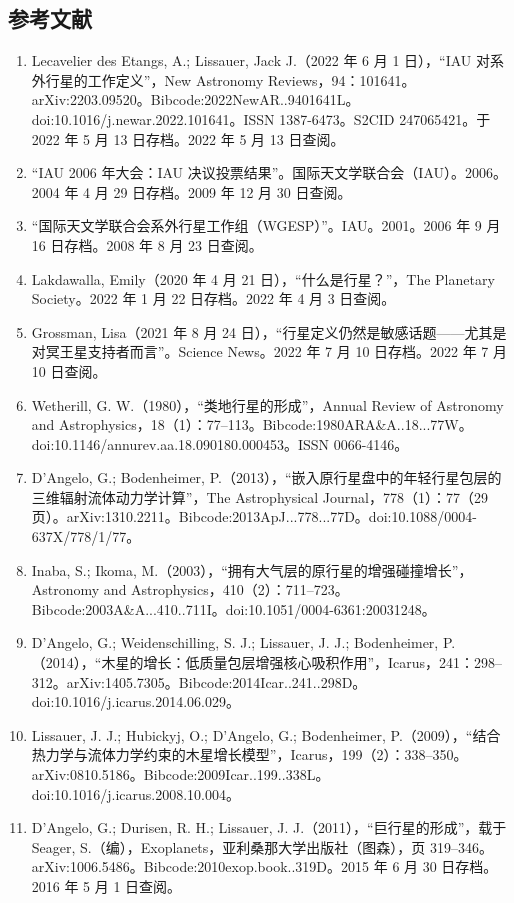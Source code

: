 \subsection{参考文献}
\begin{enumerate}
\item Lecavelier des Etangs, A.; Lissauer, Jack J.（2022 年 6 月 1 日），“IAU 对系外行星的工作定义”，New Astronomy Reviews，94：101641。arXiv:2203.09520。Bibcode:2022NewAR..9401641L。doi:10.1016/j.newar.2022.101641。ISSN 1387-6473。S2CID 247065421。于 2022 年 5 月 13 日存档。2022 年 5 月 13 日查阅。
\item “IAU 2006 年大会：IAU 决议投票结果”。国际天文学联合会（IAU）。2006。2004 年 4 月 29 日存档。2009 年 12 月 30 日查阅。
\item “国际天文学联合会系外行星工作组（WGESP）”。IAU。2001。2006 年 9 月 16 日存档。2008 年 8 月 23 日查阅。
\item Lakdawalla, Emily（2020 年 4 月 21 日），“什么是行星？”，The Planetary Society。2022 年 1 月 22 日存档。2022 年 4 月 3 日查阅。
\item Grossman, Lisa（2021 年 8 月 24 日），“行星定义仍然是敏感话题——尤其是对冥王星支持者而言”。Science News。2022 年 7 月 10 日存档。2022 年 7 月 10 日查阅。
\item Wetherill, G. W.（1980），“类地行星的形成”，Annual Review of Astronomy and Astrophysics，18（1）：77–113。Bibcode:1980ARA&A..18...77W。doi:10.1146/annurev.aa.18.090180.000453。ISSN 0066-4146。
\item D'Angelo, G.; Bodenheimer, P.（2013），“嵌入原行星盘中的年轻行星包层的三维辐射流体动力学计算”，The Astrophysical Journal，778（1）：77（29 页）。arXiv:1310.2211。Bibcode:2013ApJ...778...77D。doi:10.1088/0004-637X/778/1/77。
\item Inaba, S.; Ikoma, M.（2003），“拥有大气层的原行星的增强碰撞增长”，Astronomy and Astrophysics，410（2）：711–723。Bibcode:2003A&A...410..711I。doi:10.1051/0004-6361:20031248。
\item D'Angelo, G.; Weidenschilling, S. J.; Lissauer, J. J.; Bodenheimer, P.（2014），“木星的增长：低质量包层增强核心吸积作用”，Icarus，241：298–312。arXiv:1405.7305。Bibcode:2014Icar..241..298D。doi:10.1016/j.icarus.2014.06.029。
\item Lissauer, J. J.; Hubickyj, O.; D'Angelo, G.; Bodenheimer, P.（2009），“结合热力学与流体力学约束的木星增长模型”，Icarus，199（2）：338–350。arXiv:0810.5186。Bibcode:2009Icar..199..338L。doi:10.1016/j.icarus.2008.10.004。
\item D'Angelo, G.; Durisen, R. H.; Lissauer, J. J.（2011），“巨行星的形成”，载于 Seager, S.（编），Exoplanets，亚利桑那大学出版社（图森），页 319–346。arXiv:1006.5486。Bibcode:2010exop.book..319D。2015 年 6 月 30 日存档。2016 年 5 月 1 日查阅。

\end{enumerate}
